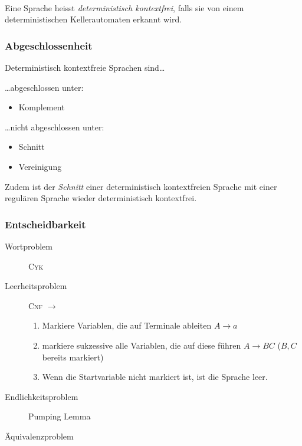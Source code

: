 \documentclass{scrartcl}
\begin{document}
\begin{shaded}
    \ \\Eine Sprache heisst \emph{deterministisch kontextfrei}, falls sie von einem deterministischen Kellerautomaten erkannt wird.
\end{shaded}

\subsubsection*{Abgeschlossenheit}
Deterministisch kontextfreie Sprachen sind\dots \\
\begin{minipage}[t]{0.48\textwidth}
\dots abgeschlossen unter:
\begin{itemize}
    \item Komplement
\end{itemize}
\end{minipage}
\hfill \vrule \hfill
\begin{minipage}[t]{0.48\textwidth}
\dots nicht abgeschlossen unter:
\begin{itemize}
    \item Schnitt
    \item Vereinigung
\end{itemize}
\end{minipage}

Zudem ist der \emph{Schnitt} einer deterministisch kontextfreien Sprache mit einer regulären Sprache wieder deterministisch kontextfrei.

\subsubsection*{Entscheidbarkeit}
\begin{description}
    \item[Wortproblem] \textsc{Cyk}
    \item[Leerheitsproblem] \textsc{Cnf} $\to$
    \begin{enumerate}
        \item Markiere Variablen, die auf Terminale ableiten $A\to a$
        \item markiere sukzessive alle Variablen, die auf diese führen $A\to BC$ ($B,C$ bereits markiert)
        \item Wenn die Startvariable nicht markiert ist, ist die Sprache leer.
    \end{enumerate}
    \item[Endlichkeitsproblem] Pumping Lemma
    \item[Äquivalenzproblem] 
\end{description}
\end{document}
